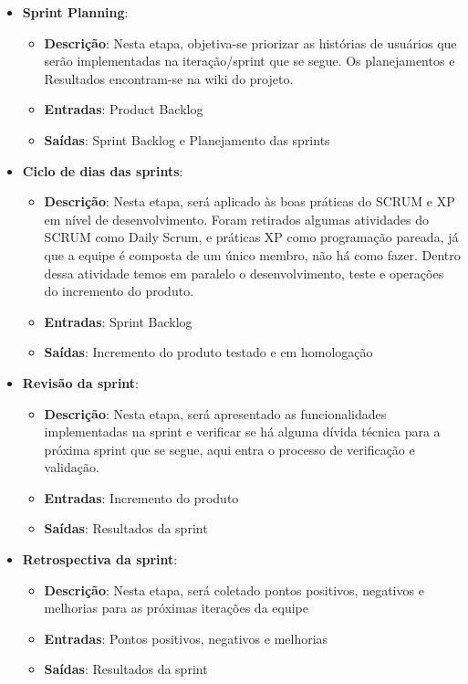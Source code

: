 \begin{itemize}
  \item \textbf{Sprint Planning}:
  \begin{itemize}
    \item \textbf{Descrição}: Nesta etapa, objetiva-se priorizar as histórias de usuários que serão implementadas na
      iteração/sprint que se segue. Os planejamentos e Resultados encontram-se na wiki do projeto.
    \item \textbf{Entradas}: Product Backlog
    \item \textbf{Saídas}: Sprint Backlog e Planejamento das sprints
  \end{itemize}
  \item \textbf{Ciclo de dias das sprints}:
  \begin{itemize}
    \item \textbf{Descrição}: Nesta etapa, será aplicado às boas práticas do SCRUM e XP em nível de desenvolvimento.
      Foram retirados algumas atividades do SCRUM como Daily Scrum, e práticas XP como programação pareada, já que
      a equipe é composta de um único membro, não há como fazer. Dentro dessa atividade temos em paralelo o
      desenvolvimento, teste e operações do incremento do produto.
    \item \textbf{Entradas}: Sprint Backlog
    \item \textbf{Saídas}: Incremento do produto testado e em homologação
  \end{itemize}
  \item \textbf{Revisão da sprint}:
  \begin{itemize}
    \item \textbf{Descrição}: Nesta etapa, será apresentado as funcionalidades implementadas na sprint e verificar
      se há alguma dívida técnica para a próxima sprint que se segue, aqui entra o processo de verificação e validação.
    \item \textbf{Entradas}: Incremento do produto
    \item \textbf{Saídas}: Resultados da sprint
  \end{itemize}
  \item \textbf{Retrospectiva da sprint}:
  \begin{itemize}
    \item \textbf{Descrição}: Nesta etapa, será coletado pontos positivos, negativos e melhorias para as próximas
      iterações da equipe
    \item \textbf{Entradas}: Pontos positivos, negativos e melhorias
    \item \textbf{Saídas}: Resultados da sprint
  \end{itemize}
\end{itemize}

